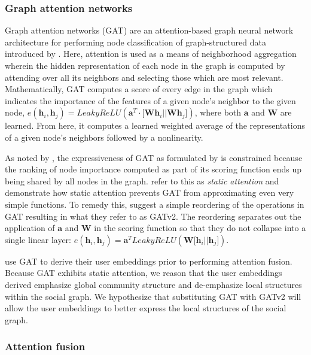 \documentclass[letterpaper]{article} %
\begin{document}
\subsubsection{Graph attention networks}

Graph attention networks (GAT) are an attention-based graph neural network architecture for performing node classification of graph-structured data introduced by \citet{Vel2017}. Here, attention is used as a means of neighborhood aggregation wherein the hidden representation of each node in the graph is computed by attending over all its neighbors and selecting those which are most relevant.  Mathematically, GAT computes a score of every edge in the graph which indicates the importance of the features of a given node's neighbor to the given node, $e(\mathbf{h}_i, \mathbf{h}_j)=LeakyReLU(\bm{a}^T \cdot \lbrack \mathbf{Wh}_i || \mathbf{Wh}_j \rbrack)$, where both $\bm{a}$ and $\mathbf{W}$ are learned. From here, it computes a learned weighted average of the representations of a given node's neighbors followed by a nonlinearity. 

As noted by \citet{Brody2021}, the expressiveness of GAT as formulated by \citet{Vel2017} is constrained because the ranking of node importance computed as part of its scoring function ends up being shared by all nodes in the graph. \citet{Brody2021} refer to this as \textit{static attention} and demonstrate how static attention prevents GAT from approximating even very simple functions. To remedy this, \citet{Brody2021} suggest a simple reordering of the operations in GAT resulting in what they refer to as GATv2. The reordering separates out the application of $\bm{a}$ and $\mathbf{W}$ in the scoring function so that they do not collapse into a single linear layer: $e(\mathbf{h}_i, \mathbf{h}_j)=\bm{a}^T LeakyReLU(\mathbf{W} \lbrack \mathbf{h}_i || \mathbf{h}_j \rbrack)$. 

\citet{Miao2022} use GAT to derive their user embeddings prior to performing attention fusion. Because GAT exhibits static attention, we reason that the user embeddings derived emphasize global community structure and de-emphasize local structures within the social graph. We hypothesize that substituting GAT with GATv2 will allow the user embeddings to better express the local structures of the social graph.

\subsubsection{Attention fusion}
\end{document}
